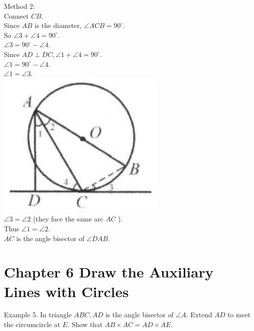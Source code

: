 \documentclass[10pt]{article}
\begin{document}
Method 2:\\
Connect \(C B\).\\
Since \(A B\) is the diameter, \(\angle A C B=90^{\circ}\).\\
So \(\angle 3+\angle 4=90^{\circ}\).\\
\(\angle 3=90^{\circ}-\angle 4\).\\
Since \(A D \perp D C, \angle 1+\angle 4=90^{\circ}\).\\
\(\angle 1=90^{\circ}-\angle 4\).\\
\(\angle 1=\angle 3\).\\
\includegraphics[max width=\textwidth, center]{2025_04_17_97bc1f7e44d93c271a88g-164(3)}\\
\(\angle 3=\angle 2\) (they face the same arc \(A C\) ).\\
Thus \(\angle 1=\angle 2\).\\
\(A C\) is the angle bisector of \(\angle D A B\).

\section*{Chapter 6 Draw the Auxiliary Lines with Circles}
Example 5. In triangle \(A B C, A D\) is the angle bisector of \(\angle A\). Extend \(A D\) to meet the circumcircle at \(E\). Show that \(A B \times A C=A D \times A E\).
\end{document}
